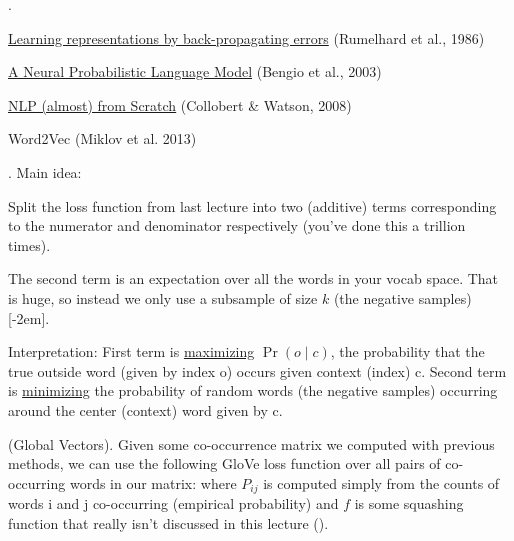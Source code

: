 \documentclass[11pt]{article}
\newcommand\myspace[1][]{\vspace{#1\bigskipamount}}
\newcommand\p{\Needspace{10\baselineskip} \noindent}
\begin{document}
\myspace
\p {}. 
\begin{compactitem}
	\item \href{https://www.iro.umontreal.ca/~vincentp/ift3395/lectures/backprop_old.pdf}{Learning representations by back-propagating errors} (Rumelhard et al., 1986)
	
	\item \href{http://www.jmlr.org/papers/volume3/bengio03a/bengio03a.pdf}{A Neural Probabilistic Language Model} (Bengio et al., 2003)
	
	\item \href{https://arxiv.org/abs/1103.0398}{NLP (almost) from Scratch} (Collobert \& Watson, 2008)
	
	\item Word2Vec (Miklov et al. 2013)
\end{compactitem}






\p {}. Main idea: 
\begin{compactitem}
	\item Split the loss function from last lecture into two (additive) terms corresponding to the numerator and denominator respectively (you've done this a trillion times).
	\item The second term is an expectation over all the words in your vocab space. That is huge, so instead we only use a subsample of size $k$ (the negative samples)[-2em].
	\item Interpretation: First term is \underline{maximizing} $\Pr(o \mid c)$, the probability that the true outside word (given by index o) occurs given context (index) c. Second term is \underline{minimizing} the probability of random words (the negative samples) occurring around the center (context) word given by c.
\end{compactitem}

\myspace
\p {} (Global Vectors). Given some co-occurrence matrix we computed with previous methods, we can use the following GloVe loss function over all pairs of co-occurring words in our matrix:
where $P_{ij}$ is computed simply from the counts of words i and j co-occurring (empirical probability) and $f$ is some squashing function that really isn't discussed in this lecture ().
\end{document}
